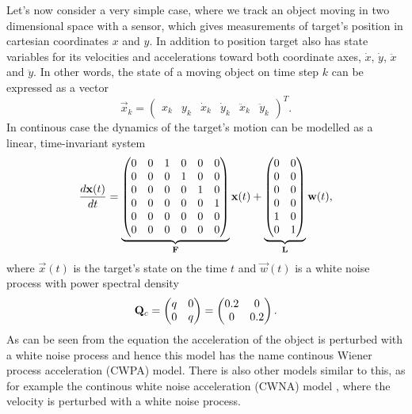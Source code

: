 Let's now consider a very simple case, where we track an object moving
in two dimensional space with a sensor, which gives measurements of
target's position in cartesian coordinates $x$ and $y$. In addition to
position target also has state variables for its velocities and accelerations toward both coordinate
axes, $\dot{x}$, $\dot{y}$, $\ddot{x}$ and $\ddot{y}$. In other words, the state of a
moving object on time step $k$ can be expressed as a vector
%
\begin{equation}
\vec{x}_k = 
\begin{pmatrix}
x_k & y_k & \dot{x}_k & \dot{y}_k & \ddot{x}_k & \ddot{y}_k
\end{pmatrix}^T.
%
\end{equation}
%
In continous case the dynamics of the target's motion can be modelled as a linear, time-invariant system
%
\begin{equation}
%
\frac{d \vec{x}(t)}{dt} = \underbrace{\begin{pmatrix}
0 & 0 & 1 & 0 & 0 & 0 \\
0 & 0 & 0 & 1 & 0 & 0 \\
0 & 0 & 0 & 0 & 1 & 0 \\
0 & 0 & 0 & 0 & 0 & 1 \\
0 & 0 & 0 & 0 & 0 & 0 \\
0 & 0 & 0 & 0 & 0 & 0 
\end{pmatrix}}_{\mat{F}} \vec{x}(t)
+
\underbrace{\begin{pmatrix}
0 & 0 \\
0 & 0 \\
0 & 0 \\
0 & 0 \\
1 & 0 \\
0 & 1 \\
\end{pmatrix}}_{\mat{L}}\vec{w}(t), \label{eq:cwpa_cont_model}
%
\end{equation}
%
where $\vec{x}(t)$ is the target's state on the time $t$ and
$\vec{w}(t)$ is a white noise process with power spectral density
%
\begin{equation}
\mathbf{Q}_c = 
\begin{pmatrix}
q & 0 \\
0   & q
\end{pmatrix}
= 
\begin{pmatrix}
0.2 & 0 \\
0   & 0.2
\end{pmatrix}.
\end{equation}
%
As can be seen from the equation the acceleration of the object is perturbed with a white noise process and hence this model has the name continous Wiener process acceleration (CWPA) model. There is also other models similar to this, as for example the continous white noise acceleration (CWNA) model \citep{Bar-Shalom+Li+Kirubarajan:2001}, where the velocity is perturbed with a white noise process.

